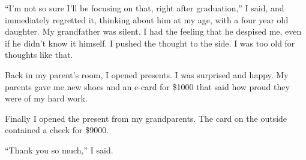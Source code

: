 ``I'm not so sure I'll be focusing on that, right after graduation,'' I said,
and immediately regretted it, thinking about him at my age, with a four year old
daughter.  My grandfather was silent.  I had the feeling that he despised me,
even if he didn't know it himself.  I pushed the thought to the side.  I was too
old for thoughts like that.

Back in my parent's room, I opened presents.  I was surprised and happy. My
parents gave me new shoes and an e-card for \$1000 that said how proud they were
of my hard work.  

Finally I opened the present from my grandparents.  The card on the outside
contained a check for \$9000.  

``Thank you so much,'' I said.
